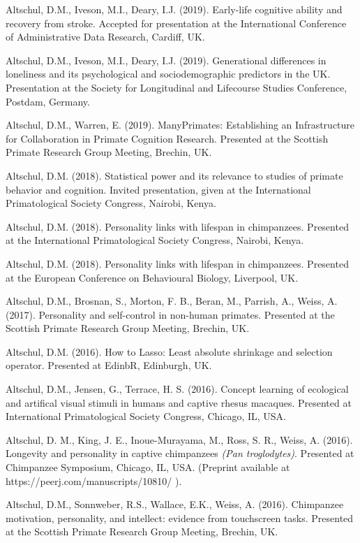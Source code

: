 \documentclass[margin,line]{res}
\begin{document}
\begin{resume}
Altschul, D.M., Iveson, M.I., Deary, I.J. (2019). Early-life cognitive ability and recovery from stroke. Accepted for presentation at the International Conference of Administrative Data Research, Cardiff, UK.

Altschul, D.M., Iveson, M.I., Deary, I.J. (2019). Generational differences in loneliness and its psychological and sociodemographic predictors in the UK. Presentation at the Society for Longitudinal and Lifecourse Studies Conference, Postdam, Germany.

Altschul, D.M., Warren, E. (2019). ManyPrimates: Establishing an Infrastructure for Collaboration in Primate Cognition Research. Presented at the Scottish Primate Research Group Meeting, Brechin, UK.

Altschul, D.M. (2018). Statistical power and its relevance to studies of primate behavior and cognition. Invited presentation, given at the International Primatological Society Congress, Nairobi, Kenya.

Altschul, D.M. (2018). Personality links with lifespan in chimpanzees. Presented at the International Primatological Society Congress, Nairobi, Kenya.

Altschul, D.M. (2018). Personality links with lifespan in chimpanzees. Presented at the European Conference on Behavioural Biology, Liverpool, UK.

Altschul, D.M., Brosnan, S., Morton, F. B., Beran, M., Parrish, A., Weiss, A. (2017). Personality and self-control in non-human primates. Presented at the Scottish Primate Research Group Meeting, Brechin, UK.

Altschul, D.M. (2016). How to Lasso: Least absolute shrinkage and selection operator. Presented at EdinbR, Edinburgh, UK.

Altschul, D.M., Jensen, G.,  Terrace, H. S. (2016). Concept learning of ecological and artifical visual stimuli in humans and captive rhesus macaques. Presented at International Primatological Society Congress, Chicago, IL, USA.

Altschul, D. M., King, J. E., Inoue-Murayama, M., Ross, S. R., Weiss, A. (2016). Longevity and personality in captive chimpanzees {\it (Pan troglodytes)}. Presented at Chimpanzee Symposium, Chicago, IL, USA. (Preprint available at https://peerj.com/manuscripts/10810/ ).

Altschul, D.M., Sonnweber, R.S., Wallace, E.K., Weiss, A. (2016). Chimpanzee motivation, personality, and intellect: evidence from touchscreen tasks. Presented at the Scottish Primate Research Group Meeting, Brechin, UK.


\end{resume}
\end{document}
